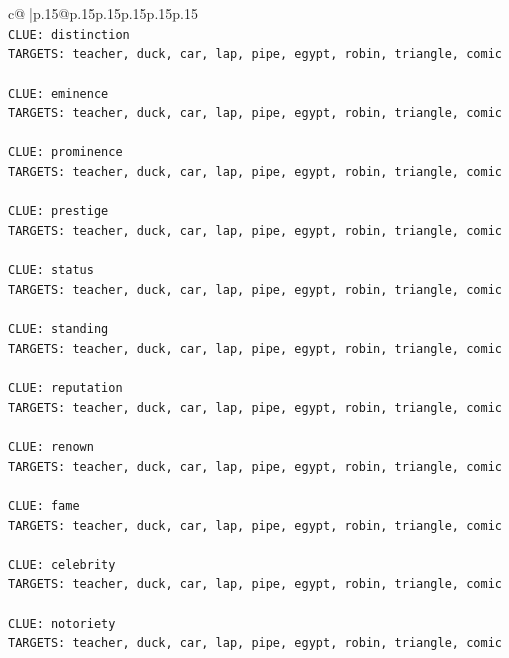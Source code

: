 \documentclass{article}
\begin{document}
{\begin{supertabular}{c@{$\;$}|p{.15\linewidth}@{}p{.15\linewidth}p{.15\linewidth}p{.15\linewidth}p{.15\linewidth}p{.15\linewidth}}
{{{\\ 
\texttt{CLUE: distinction} \\
\texttt{TARGETS: teacher, duck, car, lap, pipe, egypt, robin, triangle, comic} \\
\\ 
\texttt{CLUE: eminence} \\
\texttt{TARGETS: teacher, duck, car, lap, pipe, egypt, robin, triangle, comic} \\
\\ 
\texttt{CLUE: prominence} \\
\texttt{TARGETS: teacher, duck, car, lap, pipe, egypt, robin, triangle, comic} \\
\\ 
\texttt{CLUE: prestige} \\
\texttt{TARGETS: teacher, duck, car, lap, pipe, egypt, robin, triangle, comic} \\
\\ 
\texttt{CLUE: status} \\
\texttt{TARGETS: teacher, duck, car, lap, pipe, egypt, robin, triangle, comic} \\
\\ 
\texttt{CLUE: standing} \\
\texttt{TARGETS: teacher, duck, car, lap, pipe, egypt, robin, triangle, comic} \\
\\ 
\texttt{CLUE: reputation} \\
\texttt{TARGETS: teacher, duck, car, lap, pipe, egypt, robin, triangle, comic} \\
\\ 
\texttt{CLUE: renown} \\
\texttt{TARGETS: teacher, duck, car, lap, pipe, egypt, robin, triangle, comic} \\
\\ 
\texttt{CLUE: fame} \\
\texttt{TARGETS: teacher, duck, car, lap, pipe, egypt, robin, triangle, comic} \\
\\ 
\texttt{CLUE: celebrity} \\
\texttt{TARGETS: teacher, duck, car, lap, pipe, egypt, robin, triangle, comic} \\
\\ 
\texttt{CLUE: notoriety} \\
\texttt{TARGETS: teacher, duck, car, lap, pipe, egypt, robin, triangle, comic} \\
\\ 
}}}
\end{supertabular}}
\end{document}
